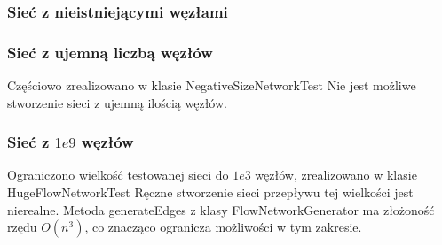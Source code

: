 \subsubsection{Sieć z nieistniejącymi węzłami}


\subsubsection{Sieć z ujemną liczbą węzłów}
Częściowo zrealizowano w klasie NegativeSizeNetworkTest Nie jest możliwe
stworzenie sieci z ujemną ilością węzłów.

\subsubsection{Sieć z $1e9$ węzłów}
Ograniczono wielkość testowanej sieci do $1e3$ węzłów, zrealizowano w klasie
HugeFlowNetworkTest Ręczne stworzenie sieci przepływu tej wielkości jest
nierealne. Metoda generateEdges z klasy FlowNetworkGenerator ma złożoność
rzędu $O(n^3)$, co znacząco ogranicza możliwości w tym zakresie.
